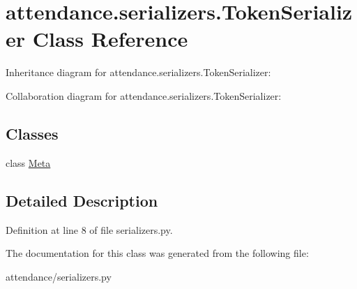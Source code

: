 \hypertarget{classattendance_1_1serializers_1_1_token_serializer}{}\section{attendance.\+serializers.\+Token\+Serializer Class Reference}
\label{classattendance_1_1serializers_1_1_token_serializer}


Inheritance diagram for attendance.\+serializers.\+Token\+Serializer\+:


Collaboration diagram for attendance.\+serializers.\+Token\+Serializer\+:
\subsection*{Classes}
\begin{DoxyCompactItemize}
\item 
class \hyperlink{classattendance_1_1serializers_1_1_token_serializer_1_1_meta}{Meta}
\end{DoxyCompactItemize}


\subsection{Detailed Description}


Definition at line 8 of file serializers.\+py.



The documentation for this class was generated from the following file\+:\begin{DoxyCompactItemize}
\item 
attendance/serializers.\+py\end{DoxyCompactItemize}
